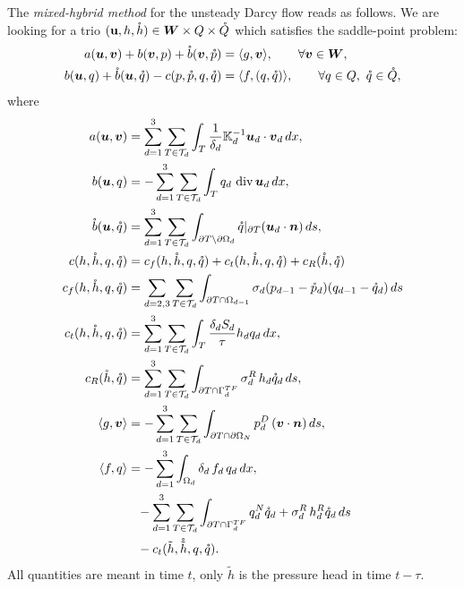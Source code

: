 The \emph{mixed-hybrid method} for the unsteady Darcy flow reads as follows.
We are looking for a trio $(\mathbf{u},h,\mathring h)  
\in \mathbf{\boldsymbol{W}}\times Q\times\mathring Q$ which satisfies the saddle-point problem:
\begin{align}
    a(\vc u,\vc v)  +b(\vc v, p) + \mr b(\vc v, \mr p)
        &=\langle g,\vc v \rangle, \qquad\forall \vc v\in \vc W,
        \label{eq:hybrid-frac-1}\\
    b(\vc u, q ) + \mr b( \vc u, \mr q) - c(p, \mr p, q, \mr q)
        &= \langle f, (q,\mr q) \rangle,
        \qquad\forall q\in Q,\ \mr q\in \mr Q, 
        \label{eq:hybrid-frac-2}
\end{align}
where
\begin{align}
    \label{eq:weak_term_a}
    a(\vc u, \vc v) &= \sum_{d=1}^{3}\sum_{T\in \mathcal T_d}
    \int_{T} \frac{1}{\delta_{d}}\tn K_{d}^{-1} 
    \vc u_d\cdot \vc v_d\,dx,
    \\
    \label{eq:weak_term_b}
    b(\vc u, q)  &= -\sum_{d=1}^{3}\sum_{T\in \mathcal T_d}
    \int_{T} q_d\,\div \vc u_d\,dx,
    \\
    \label{eq:weak_term_bf}
    \mr b(\vc u, \mr q)   &= \sum_{d=1}^{3}\sum_{T\in \mathcal T_d}
    \int_{\partial T\setminus\partial\Omega_{d}}
        \mr q|_{\partial T} ( \vc u_d\cdot\vc n)\,ds,
    \\
    \label{eq:weak_term c}
    c(h, \mr h, q, \mr q) &= c_f(h, \mr h, q, \mr q) 
    + c_t(h, \mr h, q, \mr q) + c_R(\mr h, \mr q)
    \\
    c_f(h, \mr h, q, \mr q)&=\sum_{d=2,3}\sum_{T\in \mathcal T_d}
        \int_{\partial T \cap\Omega_{d-1}} \sigma_{d} 
        (p_{d-1} - \mr p_d)(q_{d-1} - \mr q_d)\,ds
    \\
    c_t(h, \mr h, q, \mr q)&= \sum_{d=1}^{3}\sum_{T\in \mathcal T_d}
        \int_{T} \frac{\delta_d S_d}{\tau} h_d q_d\,dx,
    \\    
    c_R(\mr h, \mr q)&= \sum_{d=1}^{3}\sum_{T\in \mathcal T_d}
    \int_{\partial T\cap\Gamma_{d}^{TF}}
        \sigma_d^R\, h_d \mr q_d \,ds,
    \\
    \langle g, \vc v \rangle  & =
    -\sum_{d=1}^{3}\sum_{T\in\mathcal T_d}
    \int_{\partial T\cap\partial\Omega_N} 
        p_d^D\, (\vc v \cdot \vc n)  \,ds,
    \\
    \langle f, q \rangle  &=
    -\sum_{d=1}^{3}\int_{\Omega_d} \delta_{d}\,f_d\,q_{d}\,dx,
    \\
        &\phantom{=}-
    \sum_{d=1}^{3}\sum_{T\in\mathcal T_d}
    \int_{\partial T\cap\Gamma_d^{TF}} 
        q_d^N \mr q_d + \sigma_d^R\, h_d^R \mr q_d\,ds
    \\
        &\phantom{=}-c_t(\tilde h, \mr{\tilde{h}}, q, \mr q).
    \label{eq:weak_term_f}%
\end{align}
All quantities are meant in time $t$, only $\tilde h$ is the pressure head in time $t-\tau$.

